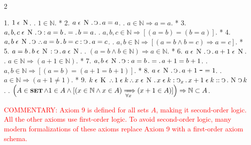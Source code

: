\documentclass{book}
\newcommand{\C}{\mathop{\sbox0{$\displaystyle$$\reflectbox{C}$} %
\raisebox{-\height+\ht0-0.05cm}[\ht0][\dp0]{\scalebox{0.8}[0.8]{\copy0}}}\displaylimits} %
\newcommand{\p}{\mathop{\sbox0{$\displaystyle$$.$}
\raisebox{-\height+\ht0}[\ht0][\dp0]{\scalebox{1}[1]{\copy0}}}\displaylimits} %
\newcommand{\pppNoSpace}{\leavevmode\lower0ex\hbox{.}\kern-0.1em\raise0.7ex\hbox{.}\kern-0.1em\lower0ex\hbox{.}} %
\newcommand{\ppp}{\thinspace \pppNoSpace\thinspace} %
\newcommand{\no}{\mathop{\thinspace \scalebox{1.5}{-}}}
\newcommand{\smallIn}{\ensuremath{\mathrel{\epsilon}}}
\newcommand{\K}{\mathop{\thinspace \text{K} \thinspace}}
\newcommand{\N}{\mathop{\thinspace \text{N} \thinspace}}
\newcommand{\setOfSets}{\mathop{\text{{\footnotesize \textbf{SET}}}}}
\renewcommand{\rightarrow}{\Rightarrow}
\renewcommand{\xrightarrow}{\xRightarrow}
\newcommand\commentary[1]{\textcolor{red}{COMMENTARY: #1}}
\newenvironment{translateTwoCol}
               { %
                 \columnratio{0.5, 0.5}
                 \begin{paracol}{2}
                 \newcommand{\LAT}{\switchcolumn[0]*}
                 \newcommand{\ENG}{\switchcolumn[1]}
               }
               { %
                 \let\ENG\undefined
                 \let\LAT\undefined
                 \end{paracol}
               }
\begin{document}
\begin{translateTwoCol}
1. \hspace{0.6cm} $1 \smallIn \N$.
\ENG
1. \hspace{0.6cm} $1 \in \mathbb{N}$.
\LAT
2. \hspace{0.6cm} $a \smallIn \N \p \C \p a = a$.
\ENG
2. \hspace{0.6cm} $a \in \mathbb{N} \rightarrow a = a$.
\LAT
3. \hspace{0.6cm} $a,b,c \smallIn \N \p \C : a = b \p = \p b = a$.
\ENG
3. \hspace{0.6cm} $a,b,c \in \mathbb{N} \rightarrow [(a = b) = (b = a)]$.
\LAT
4. \hspace{0.6cm} $a,b \smallIn \N \p \C \ppp a = b \p b = c : \C \p a = c$.
\ENG
4. \hspace{0.6cm} $a,b \in \mathbb{N} \rightarrow [(a = b \wedge b = c) \rightarrow a = c]$.
\LAT
5. \hspace{0.6cm} $a = b \p b \smallIn \N : \C \p a \smallIn \N$.
\ENG
5. \hspace{0.6cm} $(a = b \wedge b \in \mathbb{N}) \rightarrow a \in \mathbb{N}$.
\LAT
6. \hspace{0.6cm} $a \smallIn \N \p \C \p a + 1 \smallIn \N$.
\ENG
6. \hspace{0.6cm} $a \in \mathbb{N} \rightarrow (a + 1 \in \mathbb{N})$.
\LAT
7. \hspace{0.6cm} $a, b \smallIn \N \p \C : a = b \p = \p a + 1 = b + 1$.
\ENG
7. \hspace{0.6cm} $a, b \in \mathbb{N} \rightarrow [(a = b) = (a + 1 = b + 1)]$.
\LAT
8. \hspace{0.6cm} $a \smallIn \N \p \C \p a + 1 \no = 1$.
\ENG
8. \hspace{0.6cm} $a \in \mathbb{N} \rightarrow (a + 1 \neq 1)$.
\LAT
9. \hspace{0.6cm} $k \smallIn \K \ppp 1 \smallIn k \ppp x \smallIn \N \p x \smallIn k : \C_x \p x + 1 \smallIn k : : \C \p \N \C k$.
\ENG
9. \hspace{0.6cm} $\Big(A \in \setOfSets \wedge 1 \in A \wedge [(x \in \mathbb{N} \wedge x \in A) \xrightarrow[\forall x]{} (x + 1 \in A)] \Big) \rightarrow \mathbb{N} \subset A$.

\commentary{Axiom 9 is defined for all sets $A$, making it second-order logic.  All the other axioms use first-order logic.  To avoid second-order logic, many modern formalizations of these axioms replace Axiom 9 with a first-order axiom schema.}
\end{translateTwoCol}
\end{document}
